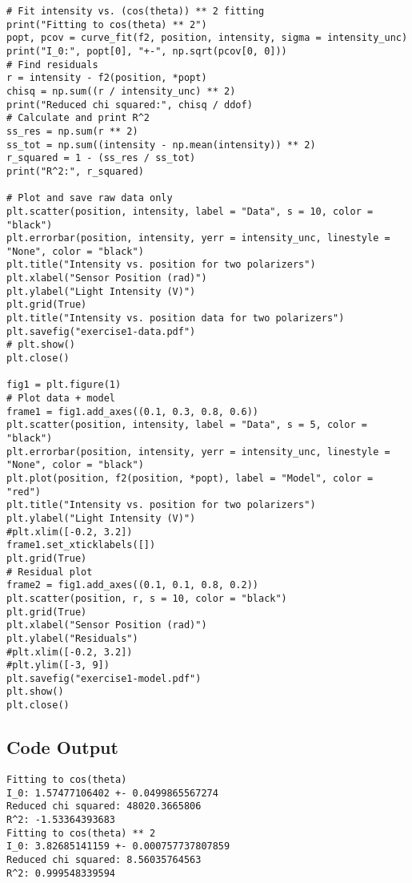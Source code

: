 \begin{lstlisting}
# Fit intensity vs. (cos(theta)) ** 2 fitting
print("Fitting to cos(theta) ** 2")
popt, pcov = curve_fit(f2, position, intensity, sigma = intensity_unc)
print("I_0:", popt[0], "+-", np.sqrt(pcov[0, 0]))
# Find residuals
r = intensity - f2(position, *popt)
chisq = np.sum((r / intensity_unc) ** 2)
print("Reduced chi squared:", chisq / ddof)
# Calculate and print R^2
ss_res = np.sum(r ** 2)
ss_tot = np.sum((intensity - np.mean(intensity)) ** 2)
r_squared = 1 - (ss_res / ss_tot)
print("R^2:", r_squared)

# Plot and save raw data only
plt.scatter(position, intensity, label = "Data", s = 10, color = "black")
plt.errorbar(position, intensity, yerr = intensity_unc, linestyle = "None", color = "black")
plt.title("Intensity vs. position for two polarizers")
plt.xlabel("Sensor Position (rad)")
plt.ylabel("Light Intensity (V)")
plt.grid(True)
plt.title("Intensity vs. position data for two polarizers")
plt.savefig("exercise1-data.pdf")
# plt.show()
plt.close()

fig1 = plt.figure(1)
# Plot data + model
frame1 = fig1.add_axes((0.1, 0.3, 0.8, 0.6))
plt.scatter(position, intensity, label = "Data", s = 5, color = "black")
plt.errorbar(position, intensity, yerr = intensity_unc, linestyle = "None", color = "black")
plt.plot(position, f2(position, *popt), label = "Model", color = "red")
plt.title("Intensity vs. position for two polarizers")
plt.ylabel("Light Intensity (V)")
#plt.xlim([-0.2, 3.2])
frame1.set_xticklabels([])
plt.grid(True)
# Residual plot
frame2 = fig1.add_axes((0.1, 0.1, 0.8, 0.2))
plt.scatter(position, r, s = 10, color = "black")
plt.grid(True)
plt.xlabel("Sensor Position (rad)")
plt.ylabel("Residuals")
#plt.xlim([-0.2, 3.2])
#plt.ylim([-3, 9])
plt.savefig("exercise1-model.pdf")
plt.show()
plt.close()
\end{lstlisting}

\subsection*{Code Output}
\begin{lstlisting}
Fitting to cos(theta)
I_0: 1.57477106402 +- 0.0499865567274
Reduced chi squared: 48020.3665806
R^2: -1.53364393683
Fitting to cos(theta) ** 2
I_0: 3.82685141159 +- 0.000757737807859
Reduced chi squared: 8.56035764563
R^2: 0.999548339594
\end{lstlisting}\vfill\pagebreak
